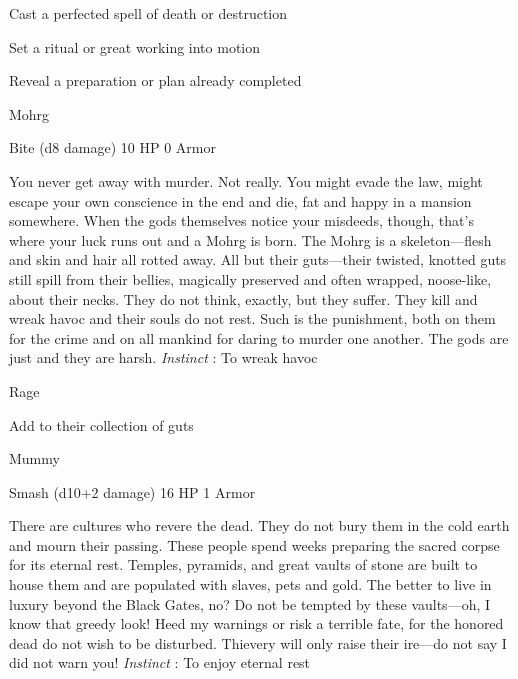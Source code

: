 \startitemize[1,packed]
         
\item Cast a perfected spell of death or destruction

         
\item Set a ritual or great working into motion

         
\item Reveal a preparation or plan already completed

       
\stopitemize
       
\startMonsterName
Mohrg	 
\stopMonsterName
       

Bite (d8 damage)	10 HP	0 Armor

       


       
\startMonsterDescription
You never get away with murder.  Not really.  You might evade the law, might escape your own conscience in the end and die, fat and happy in a mansion somewhere.  When the gods themselves notice your misdeeds, though, that’s where your luck runs out and a Mohrg is born.  The Mohrg is a skeleton—flesh and skin and hair all rotted away.  All but their guts—their twisted, knotted guts still spill from their bellies, magically preserved and often wrapped, noose-like, about their necks.  They do not think, exactly, but they suffer.  They kill and wreak havoc and their souls do not rest.  Such is the punishment, both on them for the crime and on all mankind for daring to murder one another.  The gods are just and they are harsh. {\em Instinct} : To wreak havoc
\stopMonsterDescription
       
\startitemize[1,packed]
         
\item Rage

         
\item Add to their collection of guts

       
\stopitemize
       
\startMonsterName
Mummy	 
\stopMonsterName
       

Smash (d10+2 damage)	16 HP	1 Armor

       


       
\startMonsterDescription
There are cultures who revere the dead.  They do not bury them in the cold earth and mourn their passing. These people spend weeks preparing the sacred corpse for its eternal rest.  Temples, pyramids, and great vaults of stone are built to house them and are populated with slaves, pets and gold.  The better to live in luxury beyond the Black Gates, no?  Do not be tempted by these vaults—oh, I know that greedy look!  Heed my warnings or risk a terrible fate, for the honored dead do not wish to be disturbed.  Thievery will only raise their ire—do not say I did not warn you! {\em Instinct} : To enjoy eternal rest
\stopMonsterDescription
       

